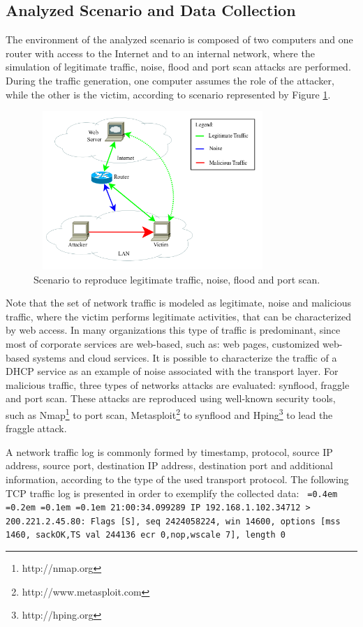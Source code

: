 \documentclass[review]{elsarticle}
\newcommand*\justify{%
	\fontdimen2\font=0.4em%
	\fontdimen3\font=0.2em%
	\fontdimen4\font=0.1em%
	\fontdimen7\font=0.1em%
}
\begin{document}
\subsection{Analyzed Scenario and Data Collection}
\label{sec:DataCollection}

The environment of the analyzed scenario is composed of two computers and one router with access to the Internet and to an internal network, where the simulation of legitimate traffic, noise, flood and port scan attacks are performed. During the traffic generation, one computer assumes the role of the attacker, while the other is the victim, according to scenario represented by Figure \ref{fig:fig1}.

\begin{figure}[h!]
     \centering 
     \includegraphics[height=6cm, width=9cm]{results/figures/fig09.png}
     \caption{Scenario to reproduce legitimate traffic, noise, flood and port scan.}
     \label{fig:fig1}
\end{figure}

Note that the set of network traffic is modeled as legitimate, noise and malicious traffic, where the victim performs legitimate activities, that can be characterized by web access. In many organizations this type of traffic is predominant, since most of corporate services are web-based, such as: web pages, customized web-based systems and cloud services. It is possible to characterize the traffic of a DHCP service as an example of noise associated with the transport layer. For malicious traffic, three types of networks attacks are evaluated: synflood, fraggle and port scan. These attacks are reproduced using well-known security tools, such as Nmap\footnote{http://nmap.org} to port scan, Metasploit\footnote{http://www.metasploit.com} to synflood and Hping\footnote{http://hping.org} to lead the fraggle attack.

A network traffic log is commonly formed by timestamp, protocol, source IP address, source port, destination IP address, destination port and additional information, according to the type of the used transport protocol. The following TCP traffic log is presented in order to exemplify the collected data:
\newline
\newline
\texttt{\justify21:00:34.099289 IP 192.168.1.102.34712 > 200.221.2.45.80: Flags [S], seq 2424058224, win 14600, options [mss 1460, sackOK,TS val 244136 ecr 0,nop,wscale 7], length 0}
\newline
\end{document}
